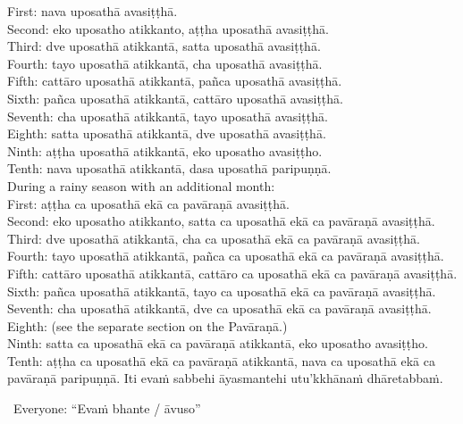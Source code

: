 {{{{{          First: nava uposathā avasiṭṭhā.\\
          Second: eko uposatho atikkanto, aṭṭha uposathā avasiṭṭhā.\\
          Third: dve uposathā atikkantā, satta uposathā avasiṭṭhā.\\
          Fourth: tayo uposathā atikkantā, cha uposathā avasiṭṭhā.\\
          Fifth: cattāro uposathā atikkantā, pañca uposathā avasiṭṭhā.\\
          Sixth: pañca uposathā atikkantā, cattāro uposathā avasiṭṭhā.\\
          Seventh: cha uposathā atikkantā, tayo uposathā avasiṭṭhā.\\
          Eighth: satta uposathā atikkantā, dve uposathā avasiṭṭhā.\\
          Ninth: aṭṭha uposathā atikkantā, eko uposatho avasiṭṭho.\\
          \smallskip
          Tenth: nava uposathā atikkantā, dasa uposathā paripuṇṇā.\\
          During a rainy season with an additional month:\\
          First: aṭṭha ca uposathā ekā ca pavāraṇā avasiṭṭhā.\\
          Second: eko uposatho atikkanto, satta ca uposathā ekā ca pavāraṇā avasiṭṭhā.\\
          Third: dve uposathā atikkantā, cha ca uposathā ekā ca pavāraṇā avasiṭṭhā.\\
          Fourth: tayo uposathā atikkantā, pañca ca uposathā ekā ca pavāraṇā avasiṭṭhā.\\
          Fifth: cattāro uposathā atikkantā, cattāro ca uposathā ekā ca pavāraṇā avasiṭṭhā.\\
          Sixth: pañca uposathā atikkantā, tayo ca uposathā ekā ca pavāraṇā avasiṭṭhā.\\
          Seventh: cha uposathā atikkantā, dve ca uposathā ekā ca pavāraṇā avasiṭṭhā.\\
          Eighth: (see the separate section on the Pavāraṇā.)\\
          Ninth: satta ca uposathā ekā ca pavāraṇā atikkantā, eko uposatho avasiṭṭho.\\
          Tenth: aṭṭha ca uposathā ekā ca pavāraṇā atikkantā, nava ca uposathā ekā ca pavāraṇā paripuṇṇā.}}}}}\makeatother \thickspace
Iti evaṁ sabbehi āyasmantehi utu'kkhānaṁ dhāretabbaṁ.

\begin{center}
  \anglebracketleft\ \hspace{-0.5mm}Everyone: ``Evaṁ bhante / āvuso'' \hspace{-0.5mm}\anglebracketright\
\end{center}

